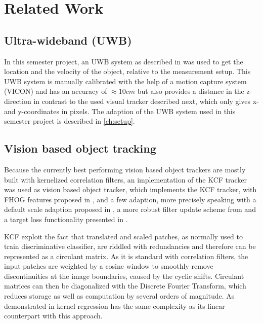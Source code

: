 
\setcounter{chapter}{1}

\chapter{Related Work}

\section{Ultra-wideband (UWB)}
In this semester project, an \ac{UWB} system as described in \cite{Naegeli:2016} was used to get the location and the velocity of the object, relative to the measurement setup. This \ac{UWB} system is manually calibrated with the help of a motion capture system (VICON) and has an accuracy of $\approx 10 cm$ but also provides a distance in the z-direction in contrast to the used visual tracker described next, which only gives x- and y-coordinates in pixels. The adaption of the \ac{UWB} system used in this semester project is described in \autoref{ch:setup}.

\section{Vision based object tracking}
Because the currently best performing vision based object trackers are mostly built with kernelized correlation filters, an implementation of the \ac{KCF} tracker \cite{henriques2015tracking} was used as vision based object tracker\cite{Haag:2015}, which implements the \ac{KCF} tracker, with FHOG features proposed in \cite{lsvm-pami}, and a few adaption, more precisely speaking with a default scale adaption proposed in \cite{danelljan2014dsst}, a more robust filter update scheme from \cite{danelljan2014colorattributes} and a target loss functionality presented in \cite{bolme2010mosse}.

\ac{KCF} exploit the fact that translated and scaled patches, as normally used to train discriminative classifier, are riddled with redundancies and therefore can be represented as a circulant matrix. As it is standard with correlation filters, the input patches are weighted by a cosine window to smoothly remove discontinuities at the image boundaries, caused by the cyclic shifts. Circulant matrices can then be diagonalized with the Discrete Fourier Transform, which reduces storage as well as computation by several orders of magnitude. As demonstrated in \cite{henriques2015tracking} kernel regression has the same complexity as its linear counterpart with this approach.

